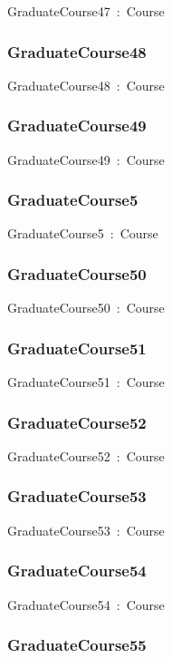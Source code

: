 \documentclass{article}
\begin{document}
GraduateCourse47~:~Course

\subsubsection*{GraduateCourse48}

GraduateCourse48~:~Course

\subsubsection*{GraduateCourse49}

GraduateCourse49~:~Course

\subsubsection*{GraduateCourse5}

GraduateCourse5~:~Course

\subsubsection*{GraduateCourse50}

GraduateCourse50~:~Course

\subsubsection*{GraduateCourse51}

GraduateCourse51~:~Course

\subsubsection*{GraduateCourse52}

GraduateCourse52~:~Course

\subsubsection*{GraduateCourse53}

GraduateCourse53~:~Course

\subsubsection*{GraduateCourse54}

GraduateCourse54~:~Course

\subsubsection*{GraduateCourse55}
\end{document}
